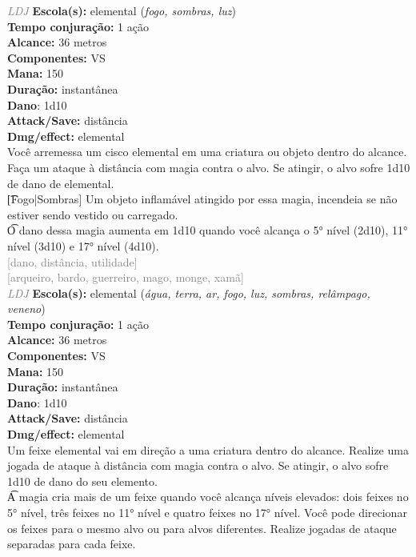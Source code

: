 \documentclass{RPG_Adventure}[2021/10/20]
\begin{document}
{\tiny \textcolor{gray}{\textit{LDJ}}}\jump{}
{\small \t \textbf{Escola(s):} elemental (\textit{fogo, sombras, luz})\\\t \textbf{Tempo conjuração:} 1 ação\\\t \textbf{Alcance:} 36 metros\\\t \textbf{Componentes:} VS\\\t \textbf{Mana:} 150\\\t \textbf{Duração:} instantânea\\\t \textbf{Dano}: 1d10\\\t \textbf{Attack/Save:} distância\\\t \textbf{Dmg/effect:} elemental\\}
{\normalsize Você arremessa um cisco elemental em uma criatura ou objeto dentro do alcance. Faça um ataque à distância com magia contra o alvo. Se atingir, o alvo sofre 1d10 de dano de elemental.\\\t [Fogo|Sombras] Um objeto inflamável atingido por essa magia, incendeia se não estiver sendo vestido ou carregado.\\\t O dano dessa magia aumenta em 1d10 quando você alcança o 5° nível (2d10), 11° nível (3d10) e 17° nível (4d10).\\}
{\scriptsize \textcolor{gray}{[dano, distância, utilidade]\\}}
{\scriptsize \textcolor{gray}{[arqueiro, bardo, guerreiro, mago, monge, xamã]\\}}
{\tiny \textcolor{gray}{\textit{LDJ}}}\jump{}
{\small \t \textbf{Escola(s):} elemental (\textit{água, terra, ar, fogo, luz, sombras, relâmpago, veneno})\\\t \textbf{Tempo conjuração:} 1 ação\\\t \textbf{Alcance:} 36 metros\\\t \textbf{Componentes:} VS\\\t \textbf{Mana:} 150\\\t \textbf{Duração:} instantânea\\\t \textbf{Dano}: 1d10\\\t \textbf{Attack/Save:} distância\\\t \textbf{Dmg/effect:} elemental\\}
{\normalsize Um feixe elemental vai em direção a uma criatura dentro do alcance. Realize uma jogada de ataque à distância com magia contra o alvo. Se atingir, o alvo sofre 1d10 de dano do seu elemento.\\\t A magia cria mais de um feixe quando você alcança níveis elevados: dois feixes no 5° nível, três feixes no 11° nível e quatro feixes no 17° nível. Você pode direcionar os feixes para o mesmo alvo ou para alvos diferentes. Realize jogadas de ataque separadas para cada feixe.\\}
\end{document}
